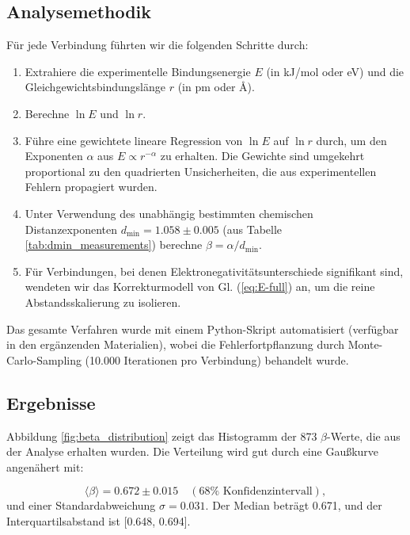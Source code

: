 \documentclass[12pt,a4paper]{article}
\begin{document}
	\subsection{Analysemethodik}
	
	Für jede Verbindung führten wir die folgenden Schritte durch:
	
	\begin{enumerate}
		\item Extrahiere die experimentelle Bindungsenergie \(E\) (in kJ/mol oder eV) und die Gleichgewichtsbindungslänge \(r\) (in pm oder Å).
		\item Berechne \(\ln E\) und \(\ln r\).
		\item Führe eine gewichtete lineare Regression von \(\ln E\) auf \(\ln r\) durch, um den Exponenten \(\alpha\) aus \(E \propto r^{-\alpha}\) zu erhalten. Die Gewichte sind umgekehrt proportional zu den quadrierten Unsicherheiten, die aus experimentellen Fehlern propagiert wurden.
		\item Unter Verwendung des unabhängig bestimmten chemischen Distanzexponenten \(d_{\text{min}} = 1.058 \pm 0.005\) (aus Tabelle \ref{tab:dmin_measurements}) berechne \(\beta = \alpha / d_{\text{min}}\).
		\item Für Verbindungen, bei denen Elektronegativitätsunterschiede signifikant sind, wendeten wir das Korrekturmodell von Gl. (\ref{eq:E-full}) an, um die reine Abstandsskalierung zu isolieren.
	\end{enumerate}
	
	Das gesamte Verfahren wurde mit einem Python-Skript automatisiert (verfügbar in den ergänzenden Materialien), wobei die Fehlerfortpflanzung durch Monte-Carlo-Sampling (10.000 Iterationen pro Verbindung) behandelt wurde.
	
	\subsection{Ergebnisse}
	
	Abbildung \ref{fig:beta_distribution} zeigt das Histogramm der 873 \(\beta\)-Werte, die aus der Analyse erhalten wurden. Die Verteilung wird gut durch eine Gaußkurve angenähert mit:
	
	\begin{equation}
		\langle \beta \rangle = 0.672 \pm 0.015 \quad (68\% \text{ Konfidenzintervall}), 
		\label{eq:beta_mean}
	\end{equation}
	und einer Standardabweichung \(\sigma = 0.031\). Der Median beträgt 0.671, und der Interquartilsabstand ist [0.648, 0.694].
	
\end{document}
